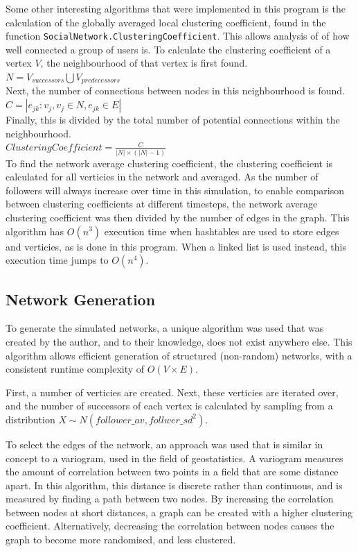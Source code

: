 \documentclass{article}
\begin{document}
Some other interesting algorithms that were implemented in this program is the calculation of the globally averaged local clustering coefficient, found in the
function \texttt{SocialNetwork.ClusteringCoefficient}.
This allows analysis of of how well connected a group of users is.
To calculate the clustering coefficient of a vertex $V$, the neighbourhood of that
vertex is first found.\\
$N = V_{successors} \bigcup V_{predecessors}$\\
Next, the number of connections between nodes in this neighbourhood is found.\\
$C = |{e_{jk} : v_j, v_j \in N, e_{jk} \in E}|$\\
Finally, this is divided by the total number of potential connections within the neighbourhood.\\
$\mathit{Clustering Coefficient} = \frac{C}{|N| \times (|N| - 1)}$\\
To find the network average clustering coefficient, the clustering coefficient
is calculated for all verticies in the network and averaged.
As the number of followers will always increase over time in this simulation,
to enable comparison between clustering coefficients at different timesteps,
the network average clustering coefficient was then divided by the number
of edges in the graph.
This algorithm has $O\left(n^3\right)$ execution time when hashtables are used to store
edges and verticies, as is done in this program. When a linked list is used instead, this execution time jumps to
$O\left(n^4\right)$.\\

\subsection{Network Generation}

To generate the simulated networks, a unique algorithm was used
that was created by the author, and to their knowledge, does not exist anywhere else.
This algorithm allows efficient generation of structured (non-random) networks,
with a consistent runtime complexity of $O\left(V \times E\right)$.

First, a number of verticies are created.
Next, these verticies are iterated over, and the number of successors of each
vertex is calculated by sampling from a distribution $X \sim N\left(follower\_av, follwer\_sd^2\right)$.

To select the edges of the network, an approach was used that is similar in concept
to a variogram, used in the field of geostatistics.
A variogram measures the amount of correlation between two points in a field that are some distance apart.
In this algorithm, this distance is discrete rather than continuous, and is measured by finding
a path between two nodes. By increasing the correlation between nodes at short distances,
a graph can be created with a higher clustering coefficient. Alternatively,
decreasing the correlation between nodes causes the graph to become more randomised,
and less clustered.
\end{document}
